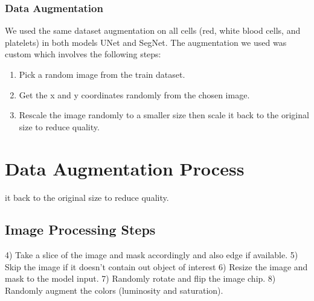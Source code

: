 \documentclass[conference]{IEEEtran}
\begin{document}
\subsubsection{Data Augmentation}
We used the same dataset augmentation on all cells (red, white blood cells, and platelets) in both models UNet and SegNet. The augmentation we used was custom which involves the following steps:
\begin{enumerate}
\item Pick a random image from the train dataset.
\item Get the x and y coordinates randomly from the chosen image.
\item Rescale the image randomly to a smaller size then scale it back to the original size to reduce quality.
\end{enumerate}

\section{Data Augmentation Process}
it back to the original size to reduce quality.
\subsection{Image Processing Steps}
4) Take a slice of the image and mask accordingly and also edge if available.
5) Skip the image if it doesn’t contain out object of interest
6) Resize the image and mask to the model input.
7) Randomly rotate and flip the image chip.
8) Randomly augment the colors (luminosity and saturation).
\end{document}
